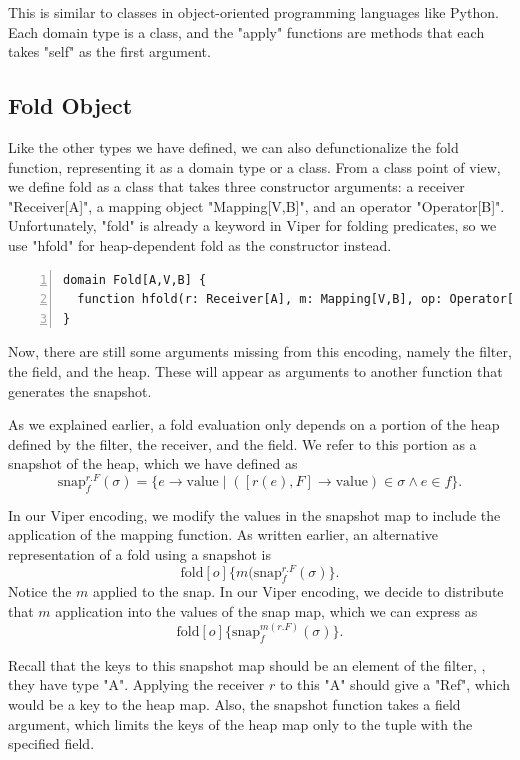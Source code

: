 \documentclass[msc,oneside]{ubcthesis}
\begin{document}
This is similar to classes in object-oriented programming languages like Python. Each domain type is a class, and the "apply" functions are methods that each takes "self" as the first argument. 

\subsection{Fold Object}
Like the other types we have defined, we can also defunctionalize the fold function, representing it as a domain type or a class. From a class point of view, we define fold as a class that takes three constructor arguments: a receiver "Receiver[A]", a mapping object "Mapping[V,B]", and an operator "Operator[B]". Unfortunately, "fold" is already a keyword in Viper for folding predicates, so we use "hfold" for heap-dependent fold as the constructor instead.
\begin{lstlisting}[language=silver,numbers=left, firstnumber=1, stepnumber=1]
domain Fold[A,V,B] {
  function hfold(r: Receiver[A], m: Mapping[V,B], op: Operator[B]): Fold[A,V,B]
}
\end{lstlisting}
Now, there are still some arguments missing from this encoding, namely the filter, the field, and the heap. These will appear as arguments to another function that generates the snapshot.

As we explained earlier, a fold evaluation only depends on a portion of the heap defined by the filter, the receiver, and the field. We refer to this portion as a snapshot of the heap, which we have defined as $$\textrm{snap}^{r.F}_{f}(\sigma) = \{ e \rightarrow \textrm{value} \mid ([r(e), F] \rightarrow \textrm{value}) \in \sigma \land e \in f\}.$$

In our Viper encoding, we modify the values in the snapshot map to include the application of the mapping function. As written earlier, an alternative representation of a fold using a snapshot is $$\textrm{fold}[o]\{m(\textrm{snap}^{r.F}_{f}(\sigma)\}.$$ Notice the $m$ applied to the snap. In our Viper encoding, we decide to distribute that $m$ application into the values of the snap map, which we can express as $$\textrm{fold}[o]\{\textrm{snap}^{m(r.F)}_{f}(\sigma)\}.$$

Recall that the keys to this snapshot map should be an element of the filter, \ie, they have type "A". Applying the receiver $r$ to this "A" should give a "Ref", which would be a key to the heap map. Also, the snapshot function takes a field argument, which limits the keys of the heap map only to the tuple with the specified field.
\end{document}
